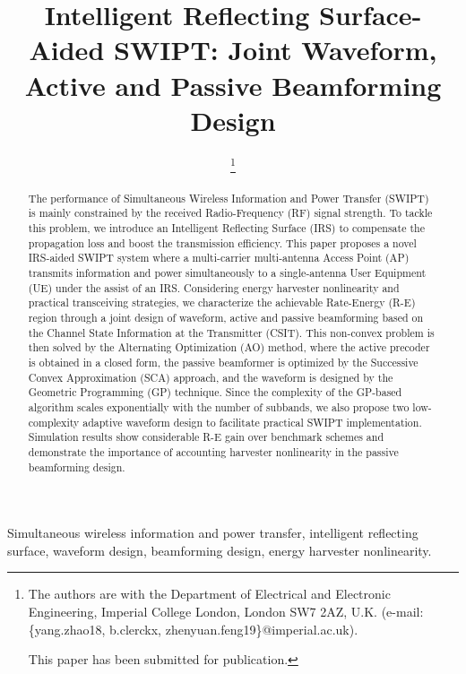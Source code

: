 \documentclass[journal]{IEEEtran}
\begin{document}
	\title{Intelligent Reflecting Surface-Aided SWIPT: Joint Waveform, Active and Passive Beamforming Design}
	\author{
		\thanks{
			The authors are with the Department of Electrical and Electronic Engineering, Imperial College London, London SW7 2AZ, U.K. (e-mail: \{yang.zhao18, b.clerckx, zhenyuan.feng19\}@imperial.ac.uk).

			This paper has been submitted for publication.
		}
	}
	\maketitle


	\begin{abstract}
		The performance of Simultaneous Wireless Information and Power Transfer (SWIPT) is mainly constrained by the received Radio-Frequency (RF) signal strength. To tackle this problem, we introduce an Intelligent Reflecting Surface (IRS) to compensate the propagation loss and boost the transmission efficiency. This paper proposes a novel IRS-aided SWIPT system where a multi-carrier multi-antenna Access Point (AP) transmits information and power simultaneously to a single-antenna User Equipment (UE) under the assist of an IRS. Considering energy harvester nonlinearity and practical transceiving strategies, we characterize the achievable Rate-Energy (R-E) region through a joint design of waveform, active and passive beamforming based on the Channel State Information at the Transmitter (CSIT). This non-convex problem is then solved by the Alternating Optimization (AO) method, where the active precoder is obtained in a closed form, the passive beamformer is optimized by the Successive Convex Approximation (SCA) approach, and the waveform is designed by the Geometric Programming (GP) technique. Since the complexity of the GP-based algorithm scales exponentially with the number of subbands, we also propose two low-complexity adaptive waveform design to facilitate practical SWIPT implementation. Simulation results show considerable R-E gain over benchmark schemes and demonstrate the importance of accounting harvester nonlinearity in the passive beamforming design.
	\end{abstract}


	\begin{IEEEkeywords}
		Simultaneous wireless information and power transfer, intelligent reflecting surface, waveform design, beamforming design, energy harvester nonlinearity.
	\end{IEEEkeywords}
\end{document}
